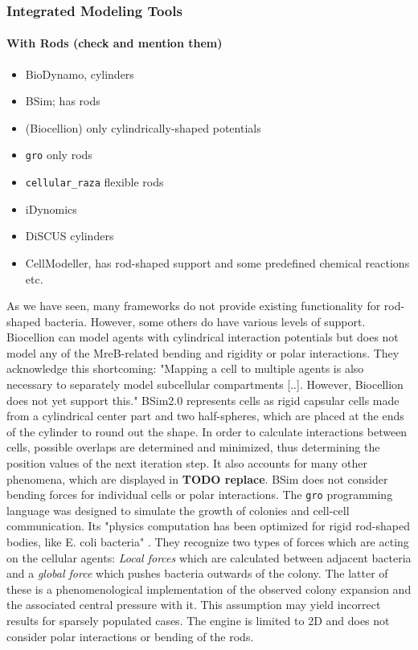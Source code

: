 \subsubsection{Integrated Modeling Tools}
\paragraph{With Rods (check and mention them)}
\begin{itemize}
    \item \cite{Breitwieser2021,breitwieser_biodynamo_2022} BioDynamo, cylinders
    \item \cite{Gorochowski2012,Matyjaszkiewicz2017} BSim; has rods
    \item \cite{Kang2014} (Biocellion) only cylindrically-shaped potentials
    \item \cite{Gutirrez2017} \texttt{gro} only rods
    \item \cite{Pleyer2025} \texttt{cellular\_raza} flexible rods
    \item \cite{Lardon2011} iDynomics
    \item \cite{GoiMoreno2015} DiSCUS cylinders
    \item \cite{Rudge2012} CellModeller, has rod-shaped support and some predefined chemical
        reactions etc.
\end{itemize}

As we have seen, many frameworks do not provide existing functionality for rod-shaped bacteria.
However, some others do have various levels of support.
Biocellion \cite{Kang2014} can model agents with cylindrical interaction potentials but does not
model any of the MreB-related bending and rigidity or polar interactions.
They acknowledge this shortcoming: "Mapping a cell to multiple agents is also necessary to
separately model subcellular compartments [..].
However, Biocellion does not yet support this." \cite{Kang2014}
BSim2.0 represents cells as rigid capsular cells made from a cylindrical center part and two
half-spheres, which are placed at the ends of the cylinder to round out the shape.
In order to calculate interactions between cells, possible overlaps are determined and minimized,
thus determining the position values of the next iteration step.
It also accounts for many other phenomena, which are displayed in \textbf{TODO replace}.
BSim does not consider bending forces for individual cells or polar interactions.
The \texttt{gro} programming language was designed to simulate the growth of colonies and cell-cell
communication.
Its "physics computation has been optimized for rigid rod-shaped bodies, like E. coli bacteria"
\cite{Gutirrez2017}.
They recognize two types of forces which are acting on the cellular agents:
\textit{Local forces} which are calculated between adjacent bacteria and a \textit{global force}
which pushes bacteria outwards of the colony.
The latter of these is a phenomenological implementation of the observed colony expansion and the
associated central pressure with it.
This assumption may yield incorrect results for sparsely populated cases.
The engine is limited to 2D and does not consider polar interactions or bending of the rods.

